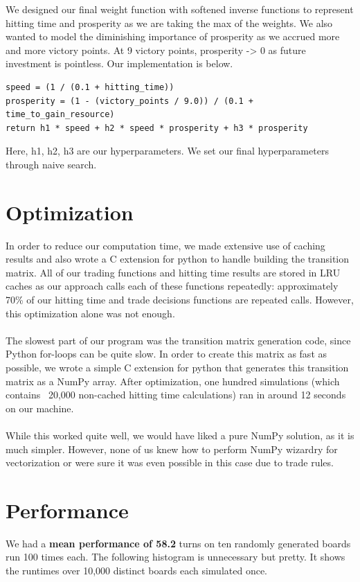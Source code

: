 \documentclass{article}
\begin{document}
We designed our final weight function with softened inverse functions to represent hitting time and prosperity as we are taking the max of the weights. We also wanted to model the diminishing importance of prosperity as we accrued more and more victory points. At 9 victory points, prosperity -> 0 as future investment is pointless. Our implementation is below.

\begin{verbatim}
speed = (1 / (0.1 + hitting_time))
prosperity = (1 - (victory_points / 9.0)) / (0.1 + time_to_gain_resource)
return h1 * speed + h2 * speed * prosperity + h3 * prosperity
\end{verbatim}
Here, h1, h2, h3 are our hyperparameters. We set our final hyperparameters through naive search.

\section*{Optimization}

In order to reduce our computation time, we made extensive use of caching results and also wrote a C extension for python to handle building the transition matrix. All of our trading functions and hitting time results are stored in LRU caches as our approach calls each of these functions repeatedly: approximately 70\% of our hitting time and trade decisions functions are repeated calls. However, this optimization alone was not enough. \\ \\
The slowest part of our program was the transition matrix generation code, since Python for-loops can be quite slow. In order to create this matrix as fast as possible, we wrote a simple C extension for python that generates this transition matrix as a NumPy array. After optimization, one hundred simulations (which contains ~20,000 non-cached hitting time calculations) ran in around 12 seconds on our machine. \\ \\
While this worked quite well, we would have liked a pure NumPy solution, as it is much simpler. However, none of us knew how to perform NumPy wizardry for vectorization or were sure it was even possible in this case due to trade rules.


\section*{Performance}

We had a \textbf{mean performance of 58.2} turns on ten randomly generated boards run 100 times each. The following histogram is unnecessary but pretty. It shows the runtimes over 10,000 distinct boards each simulated once.
\end{document}
